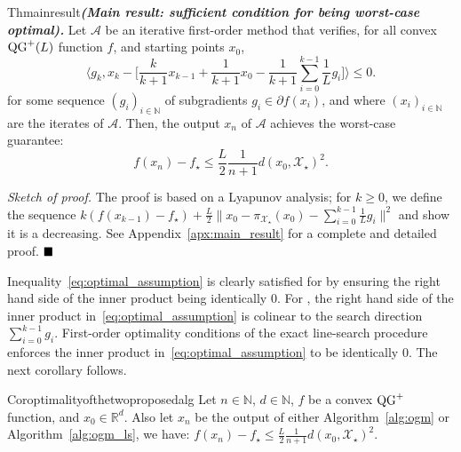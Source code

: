         \begin{center}
            \begin{restatable}{Th}{mainresult}\textbf{\emph{(Main result: sufficient condition for being worst-case optimal).}}
                \label{thm:main}
                Let $\mathcal{A}$ be an iterative first-order method that verifies, for all convex $\operatorname{QG}^+(L)$ function $f$, and starting points $x_0$,
                \begin{equation}
                    \Big\langle g_k , x_k - \Big[ \frac{k}{k+1}x_{k-1} + \frac{
                    1}{k+1}x_0 - \frac{1}{k+1}\sum_{i=0}^{k-1}\frac{1}{L} g_i \Big] \Big\rangle \leq 0. \label{eq:optimal_assumption}
                \end{equation}
                for some sequence $(g_i)_{i\in\mathbb{N}}$ of subgradients $g_i\in\partial f(x_i)$, and where $(x_i)_{i\in\mathbb{N}}$ are the iterates of $\mathcal{A}$.
                Then, the output $x_n$ of $\mathcal{A}$ achieves the worst-case guarantee:
                \begin{equation*}
                    f(x_n) - f_\star \leq \frac{L}{2}\frac{1}{n+1}d(x_0, \mathcal{X}_\star)^2.
                \end{equation*}
            \end{restatable}
        \end{center}

        \noindent \textit{Sketch of proof.}
            The proof is based on a Lyapunov analysis; for $k\geq 0$, we define the sequence
              $k(f(x_{k-1}) - f_\star) + \frac{L}{2} \| x_0 - \pi_{\mathcal{X_\star}}(x_0) - \sum_{i=0}^{k-1}\frac{1}{L} g_i \|^2$
            and show it is a decreasing.
            See Appendix~\ref{apx:main_result} for a complete and detailed proof.
        $\hfill\blacksquare$

        Inequality~\eqref{eq:optimal_assumption} is clearly satisfied for  by ensuring the right hand side of the inner product being identically $0$.
        For , the right hand side of the inner product in~\eqref{eq:optimal_assumption} is colinear to the search direction $\sum_{i=0}^{k-1} g_i$.
        First-order optimality conditions of the exact line-search procedure enforces the inner product in~\eqref{eq:optimal_assumption} to be identically $0$.
        The next corollary follows.

        \begin{center}
            \begin{restatable}{Cor}{optimalityofthetwoproposedalg} \label{cor:optimal}
            Let $n\in\mathbb{N}$, $d\in\mathbb{N}$, $f$ be a convex $\operatorname{QG}^+$ function, and $x_0\in\mathbb{R}^d$.
            Also let $x_n$ be the output of either Algorithm~\ref{alg:ogm} or Algorithm~\ref{alg:ogm_ls}, we have:
                $f(x_n) - f_\star \leq \frac{L}{2}\frac{1}{n+1}d(x_0, \mathcal{X}_\star)^2.$
            \end{restatable}
        \end{center}

